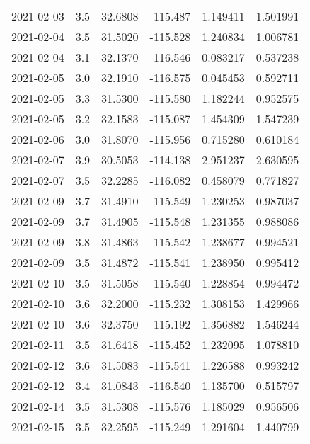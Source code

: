 \begin{tabular}{lrrrrr}
2021-02-03 &       3.5 &  32.6808 &  -115.487 &         1.149411 &         1.501991 \\
2021-02-04 &       3.5 &  31.5020 &  -115.528 &         1.240834 &         1.006781 \\
2021-02-04 &       3.1 &  32.1370 &  -116.546 &         0.083217 &         0.537238 \\
2021-02-05 &       3.0 &  32.1910 &  -116.575 &         0.045453 &         0.592711 \\
2021-02-05 &       3.3 &  31.5300 &  -115.580 &         1.182244 &         0.952575 \\
2021-02-05 &       3.2 &  32.1583 &  -115.087 &         1.454309 &         1.547239 \\
2021-02-06 &       3.0 &  31.8070 &  -115.956 &         0.715280 &         0.610184 \\
2021-02-07 &       3.9 &  30.5053 &  -114.138 &         2.951237 &         2.630595 \\
2021-02-07 &       3.5 &  32.2285 &  -116.082 &         0.458079 &         0.771827 \\
2021-02-09 &       3.7 &  31.4910 &  -115.549 &         1.230253 &         0.987037 \\
2021-02-09 &       3.7 &  31.4905 &  -115.548 &         1.231355 &         0.988086 \\
2021-02-09 &       3.8 &  31.4863 &  -115.542 &         1.238677 &         0.994521 \\
2021-02-09 &       3.5 &  31.4872 &  -115.541 &         1.238950 &         0.995412 \\
2021-02-10 &       3.5 &  31.5058 &  -115.540 &         1.228854 &         0.994472 \\
2021-02-10 &       3.6 &  32.2000 &  -115.232 &         1.308153 &         1.429966 \\
2021-02-10 &       3.6 &  32.3750 &  -115.192 &         1.356882 &         1.546244 \\
2021-02-11 &       3.5 &  31.6418 &  -115.452 &         1.232095 &         1.078810 \\
2021-02-12 &       3.6 &  31.5083 &  -115.541 &         1.226588 &         0.993242 \\
2021-02-12 &       3.4 &  31.0843 &  -116.540 &         1.135700 &         0.515797 \\
2021-02-14 &       3.5 &  31.5308 &  -115.576 &         1.185029 &         0.956506 \\
2021-02-15 &       3.5 &  32.2595 &  -115.249 &         1.291604 &         1.440799 \\

\end{tabular}
